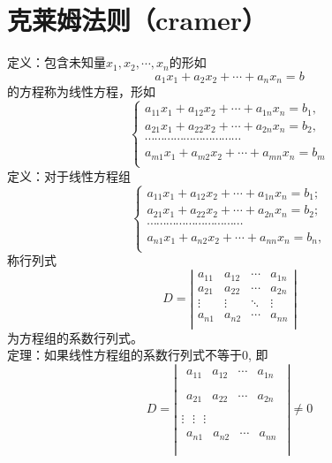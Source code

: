 \section{克莱姆法则（cramer）}
{\color{red}定义：}包含未知量$x_{1},x_{2},\cdots,x_{n}$的形如
$$a_{1}x_{1}+a_{2}x_{2}+\cdots+a_{n}x_{n}=b$$
的方程称为线性方程，形如
$$
\left\{ 
\begin{aligned}
    {{a}_{11}}{{x}_{1}}+{{a}_{12}}{{x}_{2}}+\cdots +{{a}_{1n}}{{x}_{n}}={{b}_{1}},  \\
    {{a}_{21}}{{x}_{1}}+{{a}_{22}}{{x}_{2}}+\cdots +{{a}_{2n}}{{x}_{n}}={{b}_{2}},  \\
    \cdots \cdots \cdots \cdots \cdots \cdots \cdots \cdots \cdots \cdots   \\
    {{a}_{m1}}{{x}_{1}}+{{a}_{m2}}{{x}_{2}}+\cdots +{{a}_{mn}}{{x}_{n}}={{b}_{m}}  \\
\end{aligned}
\right.
$$
{\color{red}定义：}对于线性方程组
\[\left\{ \begin{matrix}
    {{a}_{11}}{{x}_{1}}+{{a}_{12}}{{x}_{2}}+\cdots +{{a}_{1n}}{{x}_{n}}={{b}_{1}};  \\
    {{a}_{21}}{{x}_{1}}+{{a}_{22}}{{x}_{2}}+\cdots +{{a}_{2n}}{{x}_{n}}={{b}_{2}};  \\
    \cdots \cdots  \cdots \cdots \cdots \cdots \cdots \cdots \cdots \cdots   \\
    {{a}_{n1}}{{x}_{1}}+{{a}_{n2}}{{x}_{2}}+\cdots +{{a}_{nn}}{{x}_{n}}={{b}_{n}},  \\
 \end{matrix} \right.\]
 称行列式
 $$
 D=\left|\begin{matrix}
    a_{11} & a_{12} & \cdots  & a_{1n}  \\
    a_{21} & a_{22} & \cdots  & a_{2n}  \\
    \vdots & \vdots & \ddots & \vdots   \\
    a_{n1} & a_{n2} & \cdots  & a_{nn}  \\
\end{matrix} \right|
 $$
 为方程组的系数行列式。\\
 {\color{blue}定理：}如果线性方程组的系数行列式不等于0, 即
 $$
 D=\left| \begin{matrix}
    \begin{matrix}
    {{a}_{11}} & {{a}_{12}} & \cdots  & {{a}_{1n}}  \\
 \end{matrix}  \\
    \begin{matrix}
    {{a}_{21}} & {{a}_{22}} & \cdots  & {{a}_{2n}}  \\
 \end{matrix}  \\
    \vdots \text{   }\vdots \text{      }\vdots   \\
    \begin{matrix}
    {{a}_{n1}} & {{a}_{n2}} & \cdots  & {{a}_{nn}}  \\
 \end{matrix}  \\
 \end{matrix} \right|\ne 0 
 $$
